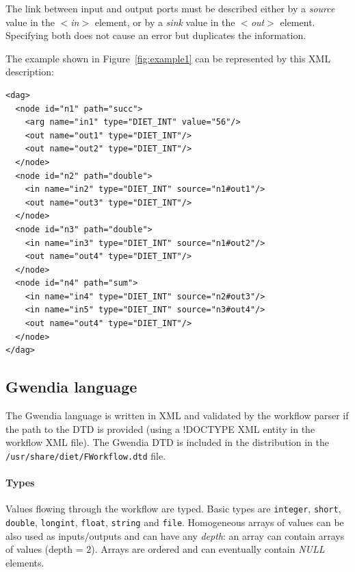 The link between input and output ports must be described either by a
\textit{source} value in the \textit{$<$in$>$} element, or by a \textit{sink} value
in the \textit{$<$out$>$} element. Specifying both does not cause an error but
duplicates the information.

The example shown in Figure~\ref{fig:example1} can be represented by this XML
description:

\begin{verbatim}
<dag>
  <node id="n1" path="succ">
    <arg name="in1" type="DIET_INT" value="56"/>
    <out name="out1" type="DIET_INT"/>
    <out name="out2" type="DIET_INT"/>
  </node>
  <node id="n2" path="double">
    <in name="in2" type="DIET_INT" source="n1#out1"/>
    <out name="out3" type="DIET_INT"/>
  </node>
  <node id="n3" path="double">
    <in name="in3" type="DIET_INT" source="n1#out2"/>
    <out name="out4" type="DIET_INT"/>
  </node>
  <node id="n4" path="sum">
    <in name="in4" type="DIET_INT" source="n2#out3"/>
    <in name="in5" type="DIET_INT" source="n3#out4"/>
    <out name="out4" type="DIET_INT"/>
  </node>
</dag>
\end{verbatim}

\subsection{Gwendia language}
\label{sec:wf_desc}
The Gwendia language is written in XML and validated by the workflow parser if
the path to the DTD is provided (using a !DOCTYPE XML entity in the workflow
XML file). The Gwendia DTD is included in the \diet distribution in the
\verb|/usr/share/diet/FWorkflow.dtd| file.

\paragraph{Types} Values flowing through the workflow are typed.
Basic types are \texttt{integer}, \texttt{short}, \texttt{double},
\texttt{longint}, \texttt{float}, \texttt{string} and
\texttt{file}. Homogeneous arrays of values can be also used as inputs/outputs
and can have any \textit{depth}: an array can contain arrays of values (depth =
2). Arrays are ordered and can eventually contain \textit{NULL} elements.

